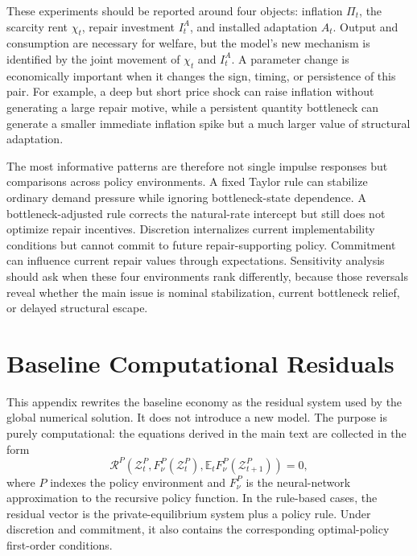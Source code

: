 ﻿\documentclass[12pt]{article}
\theoremstyle{remark}
\newcommand{\E}{\mathbb E}
\begin{document}
These experiments should be reported around four objects: inflation $\Pi_t$, the scarcity rent
$\chi_t$, repair investment $I_t^A$, and installed adaptation $A_t$. Output and consumption are
necessary for welfare, but the model's new mechanism is identified by the joint movement of
$\chi_t$ and $I_t^A$. A parameter change is economically important when it changes the sign,
timing, or persistence of this pair. For example, a deep but short price shock can raise inflation
without generating a large repair motive, while a persistent quantity bottleneck can generate a
smaller immediate inflation spike but a much larger value of structural adaptation.

The most informative patterns are therefore not single impulse responses but comparisons across
policy environments. A fixed Taylor rule can stabilize ordinary demand pressure while ignoring
bottleneck-state dependence. A bottleneck-adjusted rule corrects the natural-rate intercept but
still does not optimize repair incentives. Discretion internalizes current implementability
conditions but cannot commit to future repair-supporting policy. Commitment can influence current
repair values through expectations. Sensitivity analysis should ask when these four environments
rank differently, because those reversals reveal whether the main issue is nominal stabilization,
current bottleneck relief, or delayed structural escape.

\section{Baseline Computational Residuals}
\label{app:computational_residual_system}

This appendix rewrites the baseline economy as the residual system used by the global numerical
solution. It does not introduce a new model. The purpose is purely computational: the equations
derived in the main text are collected in the form
\begin{equation}
    \mathcal R^P
    \left(
        \mathcal Z_t^P,
        F_\nu^P(\mathcal Z_t^P),
        \E_t F_\nu^P(\mathcal Z_{t+1}^P)
    \right)
    =
    0,
    \label{eq:app_deqn_master_residual}
\end{equation}
where $P$ indexes the policy environment and $F_\nu^P$ is the neural-network approximation to the
recursive policy function. In the rule-based cases, the residual vector is the private-equilibrium
system plus a policy rule. Under discretion and commitment, it also contains the corresponding
optimal-policy first-order conditions.
\end{document}

